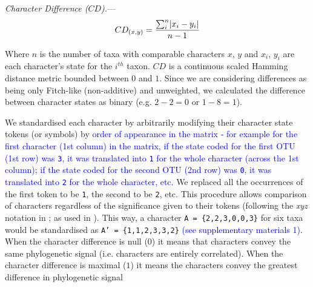 \documentclass[12pt,letterpaper]{article}
\DeclarePairedDelimiter\abs{\lvert}{\rvert}%
\renewcommand{\subsubsection}[1]{%
\vspace{2ex}
\noindent
\textit{#1.}---}
\begin{document}
\subsubsection{Character Difference ($CD$)}
\begin{equation}
    CD_{(x,y)} = \frac{\sum_{i}^{n}\abs{x_{i} - y_{i}}}{n-1}
\end{equation}

\noindent Where $n$ is the number of taxa with comparable characters $x$, $y$ and $x_i$, $y_i$ are each character's state for the $i^{th}$ taxon.
$CD$ is a continuous scaled Hamming distance metric bounded between $0$ and $1$.
Since we are considering differences as being only Fitch-like (non-additive) and unweighted, we calculated the difference between character states as binary (e.g. $2 - 2 = 0$ or $1 - 8 = 1$).

We standardised each character by arbitrarily modifying their character state tokens (or symbols) by \textcolor{blue}{order of appearance in the matrix - for example for the first character (1st column) in the matrix, if the state coded for the first OTU (1st row) was \texttt{3}, it was translated into \texttt{1} for the whole character (across the 1st column); if the state coded for the second OTU (2nd row) was \texttt{0}, it was translated into \texttt{2} for the whole character, etc.}
We replaced all the occurrences of the first token to be \texttt{1}, the second to be \texttt{2}, etc.
This procedure allows comparison of characters regardless of the significance given to their tokens (following the \textit{xyz} notation in \citealt{felsenstein2004inferring}; as used in \citealt{Davalos01072014}).
This way, a character \texttt{A = \{2,2,3,0,0,3\}} for six taxa would be standardised as \texttt{A' = \{1,1,2,3,3,2\}} \textcolor{blue}{(see supplementary materials 1)}.
When the character difference is null ($0$) it means that characters convey the same phylogenetic signal (i.e. characters are entirely correlated). 
When the character difference is maximal ($1$) it means the characters convey the greatest difference in phylogenetic signal
\end{document}
